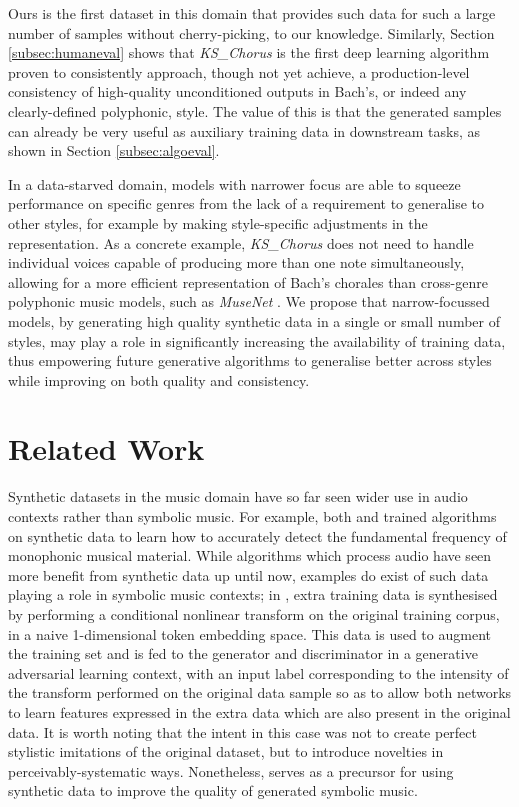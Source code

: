 \documentclass{article}
\begin{document}
Ours is the first dataset in this domain that provides such data for such a large number of samples without cherry-picking, to our knowledge. Similarly, Section \ref{subsec:humaneval} shows that \textit{KS\_Chorus} is the first deep learning algorithm proven to consistently approach, though not yet achieve, a production-level consistency of high-quality unconditioned outputs in Bach's, or indeed any  clearly-defined polyphonic, style. The value of this is that the generated samples can already be very useful as auxiliary training data in downstream tasks, as shown in Section \ref{subsec:algoeval}.

In a data-starved domain, models with narrower focus are able to squeeze performance on specific genres from the lack of a requirement to generalise to other styles, for example by making style-specific adjustments in the representation. As a concrete example, \textit{KS\_Chorus} does not need to handle individual voices capable of producing more than one note simultaneously, allowing for a more efficient representation of Bach's chorales than cross-genre polyphonic music models, such as \textit{MuseNet} \cite{musenet}. We propose that narrow-focussed models, by generating high quality synthetic data in a single or small number of styles, may play a role in significantly increasing the availability of training data, thus empowering future generative algorithms to generalise better across styles while improving on both quality and consistency.

\section{Related Work}\label{sec:relatedwork}
Synthetic datasets in the music domain have so far seen wider use in audio contexts rather than symbolic music. For example, both \cite{pyin} and \cite{crepe} trained algorithms on synthetic data to learn how to accurately detect the fundamental frequency of monophonic musical material. While algorithms which process audio have seen more benefit from synthetic data up until now, examples do exist of such data playing a role in symbolic music contexts; in \cite{gankyoku}, extra training data is synthesised by performing a conditional nonlinear transform on the original training corpus, in a naive 1-dimensional token embedding space. This data is used to augment the training set and is fed to the generator and discriminator in a generative adversarial learning context, with an input label corresponding to the intensity of the transform performed on the original data sample so as to allow both networks to learn features expressed in the extra data which are also present in the original data. It is worth noting that the intent in this case was not to create perfect stylistic imitations of the original dataset, but to introduce novelties in perceivably-systematic ways. Nonetheless, \cite{gankyoku} serves as a precursor for using synthetic data to improve the quality of generated symbolic music.
\end{document}
